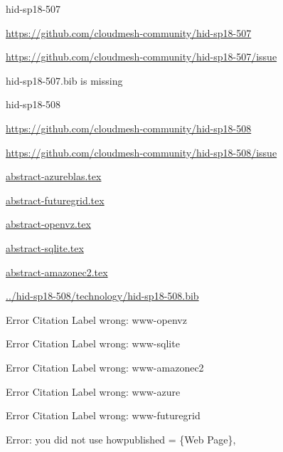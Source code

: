 \begin{IU}

hid-sp18-507

\url{https://github.com/cloudmesh-community/hid-sp18-507}

\url{https://github.com/cloudmesh-community/hid-sp18-507/issue}

hid-sp18-507.bib is missing

\end{IU}


\begin{IU}

hid-sp18-508

\url{https://github.com/cloudmesh-community/hid-sp18-508}

\url{https://github.com/cloudmesh-community/hid-sp18-508/issue}

\href{https://github.com/cloudmesh-community/hid-sp18-508/blob/master//technology/abstract-azureblas.tex}{abstract-azureblas.tex}

\href{https://github.com/cloudmesh-community/hid-sp18-508/blob/master//technology/abstract-futuregrid.tex}{abstract-futuregrid.tex}

\href{https://github.com/cloudmesh-community/hid-sp18-508/blob/master//technology/abstract-openvz.tex}{abstract-openvz.tex}

\href{https://github.com/cloudmesh-community/hid-sp18-508/blob/master//technology/abstract-sqlite.tex}{abstract-sqlite.tex}

\href{https://github.com/cloudmesh-community/hid-sp18-508/blob/master//technology/abstract-amazonec2.tex}{abstract-amazonec2.tex}

\href{https://github.com/cloudmesh-community/hid-sp18-508/blob/master//technology/hid-sp18-508.bib}{../hid-sp18-508/technology/hid-sp18-508.bib}

 Error Citation Label wrong: www-openvz

 Error Citation Label wrong: www-sqlite

 Error Citation Label wrong: www-amazonec2

 Error Citation Label wrong: www-azure

 Error Citation Label wrong: www-futuregrid

Error: you did not use howpublished = \{Web Page\},

\end{IU}


